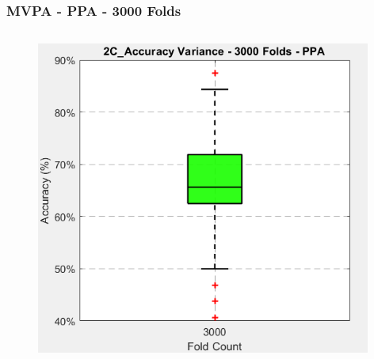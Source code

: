 \begin{frame}
\frametitle{MVPA - PPA - 3000 Folds}
	\begin{columns}
		\begin{column}{0.49\textwidth}		
			\begin{itemize}
			\end{itemize}
			\begin{figure}
				\centering
				\includegraphics[width=0.98\textwidth]{assets/box_2C_3000_ppa.png}
			\end{figure}
		\end{column}


\end{columns}
\end{frame}
